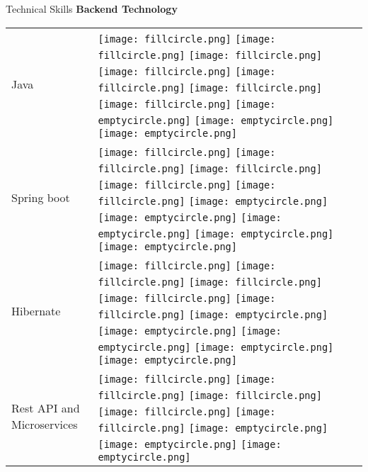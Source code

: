 \documentclass{resume}
\begin{document}
\begin{rSection}{Technical Skills}
{\bf Backend Technology}
\begin{table}[h!]
  \begin{tabular}{p{10cm}p{6cm}}
  Java & 
  \texttt{[image: fillcircle.png]} 
  \texttt{[image: fillcircle.png]} 
  \texttt{[image: fillcircle.png]}
  \texttt{[image: fillcircle.png]} 
  \texttt{[image: fillcircle.png]}
  \texttt{[image: fillcircle.png]} 
  \texttt{[image: fillcircle.png]}
  \texttt{[image: emptycircle.png]} 
  \texttt{[image: emptycircle.png]} 
  \texttt{[image: emptycircle.png]} \\
  Spring boot & 
  \texttt{[image: fillcircle.png]} 
  \texttt{[image: fillcircle.png]} 
  \texttt{[image: fillcircle.png]}
  \texttt{[image: fillcircle.png]} 
  \texttt{[image: fillcircle.png]}
  \texttt{[image: emptycircle.png]} 
  \texttt{[image: emptycircle.png]}
  \texttt{[image: emptycircle.png]} 
  \texttt{[image: emptycircle.png]} 
  \texttt{[image: emptycircle.png]} \\
  Hibernate & 
  \texttt{[image: fillcircle.png]} 
  \texttt{[image: fillcircle.png]} 
  \texttt{[image: fillcircle.png]}
  \texttt{[image: fillcircle.png]} 
  \texttt{[image: fillcircle.png]}
  \texttt{[image: emptycircle.png]} 
  \texttt{[image: emptycircle.png]}
  \texttt{[image: emptycircle.png]} 
  \texttt{[image: emptycircle.png]} 
  \texttt{[image: emptycircle.png]} \\
  Rest API and Microservices & 
  \texttt{[image: fillcircle.png]} 
  \texttt{[image: fillcircle.png]} 
  \texttt{[image: fillcircle.png]}
  \texttt{[image: fillcircle.png]} 
  \texttt{[image: fillcircle.png]}
  \texttt{[image: emptycircle.png]} 
  \texttt{[image: emptycircle.png]}
  \texttt{[image: emptycircle.png]} 

\end{tabular}
\end{table}
\end{rSection}
\end{document}
